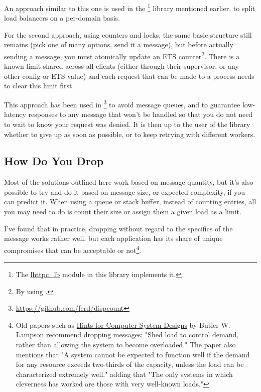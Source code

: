 An approach similar to this one is used in the \footnote{The \href{https://github.com/ferd/lhttpc/blob/master/src/lhttpc\_lb.erl}{lhttpc\_lb} module in this library implements it.} library mentioned earlier, to split load balancers on a per-domain basis.

For the second approach, using counters and locks, the same basic structure still remains (pick one of many options, send it a message), but before actually sending a message, you must atomically update an ETS counter\footnote{By using .}. There is a known limit shared across all clients (either through their supervisor, or any other config or ETS value) and each request that can be made to a process needs to clear this limit first.

This approach has been used in \footnote{\href{https://github.com/ferd/dispcount}{https://github.com/ferd/dispcount}} to avoid message queues, and to guarantee low-latency responses to any message that won't be handled so that you do not need to wait to know your request was denied. It is then up to the user of the library whether to give up as soon as possible, or to keep retrying with different workers.

\subsection{How Do You Drop}

Most of the solutions outlined here work based on message quantity, but it's also possible to try and do it based on message size, or expected complexity, if you can predict it. When using a queue or stack buffer, instead of counting entries, all you may need to do is count their size or assign them a given load as a limit.

I've found that in practice, dropping without regard to the specifics of the message works rather well, but each application has its share of unique compromises that can be acceptable or not\footnote{Old papers such as \href{http://research.microsoft.com/en-us/um/people/blampson/33-hints/webpage.html}{Hints for Computer System Designs} by Butler W. Lampson recommend dropping messages: "Shed load to control demand, rather than allowing the system to become overloaded." The paper also mentions that  "A system cannot be expected to function well if the demand for any resource exceeds two-thirds of the capacity, unless the load can be characterized extremely well." adding that "The only systems in which cleverness has worked are those with very well-known loads."}.

